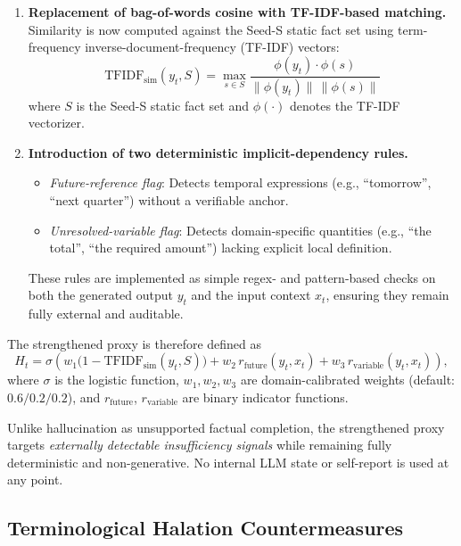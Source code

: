 \documentclass[11pt,a4paper]{article}
\begin{document}
\begin{enumerate}
    \item \textbf{Replacement of bag-of-words cosine with TF-IDF-based matching.} \\
          Similarity is now computed against the Seed-S static fact set using
          term-frequency inverse-document-frequency (TF-IDF) vectors:
          \[
          \mathrm{TFIDF}_{\mathrm{sim}}(y_t, S) =
          \max_{s \in S} \frac{\phi(y_t) \cdot \phi(s)}{\|\phi(y_t)\| \,\|\phi(s)\|}
          \]
          where \(S\) is the Seed-S static fact set and \(\phi(\cdot)\) denotes the
          TF-IDF vectorizer.

    \item \textbf{Introduction of two deterministic implicit-dependency rules.} \\
          \begin{itemize}
              \item \emph{Future-reference flag}: Detects temporal expressions
                    (e.g., ``tomorrow'', ``next quarter'') without a verifiable anchor.
              \item \emph{Unresolved-variable flag}: Detects domain-specific quantities
                    (e.g., ``the total'', ``the required amount'') lacking explicit
                    local definition.
          \end{itemize}
          These rules are implemented as simple regex- and pattern-based checks on
          both the generated output \(y_t\) and the input context \(x_t\), ensuring
          they remain fully external and auditable.
\end{enumerate}

The strengthened proxy is therefore defined as
\[
H_t = \sigma\!\left(
w_1 \bigl(1 - \mathrm{TFIDF}_{\mathrm{sim}}(y_t,S)\bigr)
+ w_2 \, r_{\mathrm{future}}(y_t,x_t)
+ w_3 \, r_{\mathrm{variable}}(y_t,x_t)
\right),
\]
where \(\sigma\) is the logistic function, \(w_1, w_2, w_3\) are domain-calibrated
weights (default: \(0.6/0.2/0.2\)), and \(r_{\mathrm{future}}\), \(r_{\mathrm{variable}}\)
are binary indicator functions.

Unlike hallucination as unsupported factual completion, the strengthened proxy
targets \emph{externally detectable insufficiency signals} while remaining fully
deterministic and non-generative. No internal LLM state or self-report is used at
any point.

\subsection{Terminological Halation Countermeasures}
\label{sec:terminological_halation}
\end{document}
